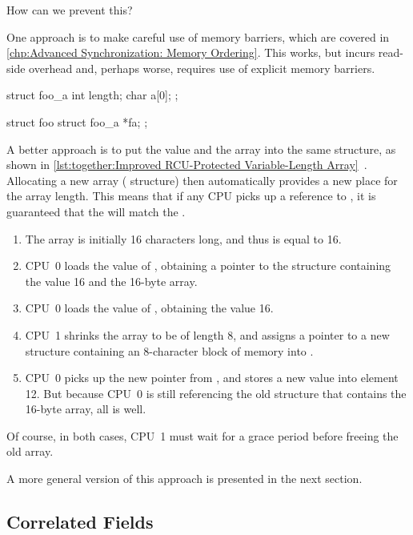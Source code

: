 How can we prevent this?

One approach is to make careful use of memory barriers, which are
covered in \cref{chp:Advanced Synchronization: Memory Ordering}.
This works, but incurs read-side overhead and, perhaps worse, requires
use of explicit memory barriers.

\begin{listing}
\begin{VerbatimL}[tabsize=8]
struct foo_a {
	int length;
	char a[0];
};

struct foo {
	struct foo_a *fa;
};
\end{VerbatimL}
\caption{Improved RCU-Protected Variable-Length Array}
\label{lst:together:Improved RCU-Protected Variable-Length Array}
\end{listing}

A better approach is to put the value and the array into the same structure,
as shown in
\cref{lst:together:Improved RCU-Protected Variable-Length Array}~\cite{Arcangeli03}.
Allocating a new array ( structure) then automatically provides
a new place for the array length.
This means that if any CPU picks up a reference to , it is
guaranteed that the  will match the .

\begin{enumerate}
\item	The array is initially 16 characters long, and thus 
	is equal to 16.
\item	CPU~0 loads the value of , obtaining a pointer to
	the structure containing the value 16 and the 16-byte array.
\item	CPU~0 loads the value of , obtaining the value 16.
\item	CPU~1 shrinks the array to be of length 8, and assigns a pointer
	to a new  structure containing an 8-character block
	of memory into .
\item	CPU~0 picks up the new pointer from , and stores a
	new value into element 12.
	But because CPU~0 is still referencing the old 
	structure that contains the 16-byte array, all is well.
\end{enumerate}

Of course, in both cases, CPU~1 must wait for a grace period before
freeing the old array.

A more general version of this approach is presented in the next section.

\subsection{Correlated Fields}
\label{sec:together:Correlated Fields}

